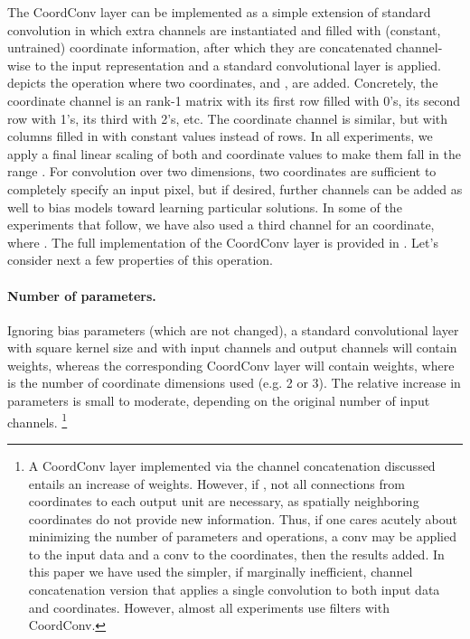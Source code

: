 \documentclass{article}
\begin{document}
The CoordConv layer can be implemented as a simple extension of standard convolution in which extra channels are instantiated and filled with (constant, untrained) coordinate information, after which they are  concatenated channel-wise to the input representation and a standard convolutional layer is applied.
 depicts the operation where two coordinates,  and , are added.
Concretely, the  coordinate channel is an  rank-1 matrix with its first row filled with 0's, its second row with 1's, its third with 2's, etc. The  coordinate channel is similar, but with columns filled in with constant values instead of rows. In all experiments, we apply a final linear scaling of both  and  coordinate values to make them fall in the range .
For convolution over two dimensions, two  coordinates are sufficient to completely specify an input pixel, but if desired, further channels can be added as well to bias models toward learning particular solutions.
In some of the experiments that follow, we have also used a third channel for an  coordinate, where . The full implementation of the CoordConv layer is provided in .
Let's consider next a few properties of this operation.

\paragraph{Number of parameters.} \vspace*{-.6em}
Ignoring bias parameters (which are not changed), a standard convolutional layer with square kernel size  and with  input channels and  output channels will contain  weights, whereas the corresponding CoordConv layer will contain  weights, where  is the number of coordinate dimensions used (e.g. 2 or 3). The relative increase in parameters is small to moderate, depending on the original number of input channels.
\footnote{A CoordConv layer implemented via the channel concatenation discussed entails an increase of  weights. However, if , not all  connections from coordinates to each output unit are necessary, as spatially neighboring coordinates do not provide new information. Thus, if one cares acutely about minimizing the number of parameters and operations, a  conv may be applied to the input data and a  conv to the coordinates, then the results added. In this paper we have used the simpler, if marginally inefficient, channel concatenation version that applies a single convolution to both input data and coordinates. However, almost all experiments use  filters with CoordConv.}
\end{document}
